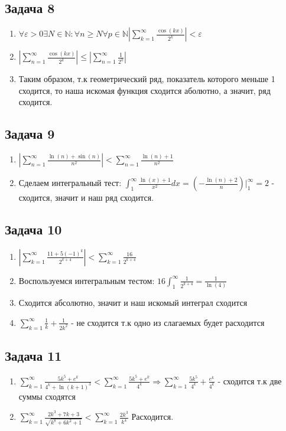\documentclass[a4paper,12pt]{article}
\begin{document}
\subsection{Задача 8}
\begin{enumerate}
	\item $\forall \varepsilon > 0 \exists N \in \mathbb{N}: \forall n \ge N \forall p \in \mathbb{N} |\sum_{k=1}^{\infty} \frac{\cos(kx)}{2^k}| < \varepsilon $
	\item $|\sum_{n=1}^{\infty} \frac{\cos(kx)}{2^k}| \le |\sum_{n=1}^{\infty} \frac{1}{2^k}|$
	\item Таким образом, т.к геометрический ряд, показатель которого меньше 1 сходится, то наша искомая функция сходится аболютно, а значит, ряд сходится.
\end{enumerate}

\subsection{Задача 9}
\begin{enumerate}
	\item $|\sum_{n=1}^{\infty} \frac{\ln(n)+\sin(n)}{n^2}| < \sum_{n=1}^{\infty} \frac{\ln(n)+1}{n^2}$
	\item Сделаем интегральный тест: $\int_{1}^{\infty} \frac{\ln(x)+1}{x^2}dx = (-\frac{\ln(n)+2}{n})|_{1}^{\infty} = 2$ - сходится, значит и наш ряд сходится.
\end{enumerate}

\subsection{Задача 10}
\begin{enumerate}
	\item $|\sum_{k=1}^{\infty} \frac{11+5(-1)^k}{2^{k+4}}|<\sum_{k=1}^{\infty} \frac{16}{2^{k+4}}$
	\item Воспользуемся интегральным тестом: $16 \int_{1}^{\infty} \frac{1}{2^{k+4}} = \frac{1}{\ln(4)}$
	\item Сходится абсолютно, значит и наш искомый интеграл сходится
	\item $\sum_{k=1}^{\infty} \frac{1}{k} + \frac{1}{2k^2}$ - не сходится т.к одно из слагаемых будет расходится
\end{enumerate}

\subsection{Задача 11}
\begin{enumerate}
	\item $\sum_{k=1}^{\infty} \frac{5k^5+e^k}{4^k+\ln(k+1)^3} < \sum_{k=1}^{\infty} \frac{5k^5+e^k}{4^k} \Rightarrow \sum_{k=1}^{\infty} \frac{5k^5}{4^k} + \frac{e^k}{4^k}$ - сходится т.к две суммы сходятся
	\item $\sum_{k=1}^{\infty} \frac{2k^3+7k+3}{\sqrt{k^8+6k^2+1}} < \sum_{k=1}^{\infty} \frac{2k^3}{k^4}$ Расходится.
\end{enumerate}
\end{document}
